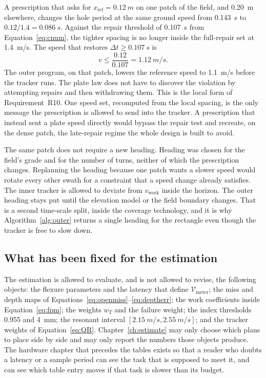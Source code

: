 A prescription that asks for \(x_{\mathrm{ref}}=\SI{0.12}{m}\) on one patch of the field, and \SI{0.20}{m} elsewhere, changes the hole period at the same ground speed from \SI{0.143}{s} to \(0.12/1.4=\SI{0.086}{s}\). Against the repair threshold of \SI{0.107}{s} from Equation~\eqref{eq:cnum}, the tighter spacing is no longer inside the full-repair set at \SI{1.4}{m/s}. The speed that restores \(\Delta t\ge\SI{0.107}{s}\) is
\begin{equation}
\label{eq:vpresc}
v \le \frac{0.12}{0.107} = \SI{1.12}{m/s}.
\end{equation}
The outer program, on that patch, lowers the reference speed to \SI{1.1}{m/s} before the tracker runs. The plate law does not have to discover the violation by attempting repairs and then withdrawing them. This is the local form of Requirement~R10. One speed set, recomputed from the local spacing, is the only message the prescription is allowed to send into the tracker. A prescription that instead sent a plate speed directly would bypass the repair test and recreate, on the dense patch, the late-repair regime the whole design is built to avoid.

The same patch does not require a new heading. Heading was chosen for the field's grade and for the number of turns, neither of which the prescription changes. Replanning the heading because one patch wants a slower speed would rotate every other swath for a constraint that a speed change already satisfies. The inner tracker is allowed to deviate from \(v_{\mathrm{work}}\) inside the horizon. The outer heading stays put until the elevation model or the field boundary changes. That is a second time-scale split, inside the coverage technology, and it is why Algorithm~\ref{alg:outer} returns a single heading for the rectangle even though the tracker is free to slow down.

\subsection{What has been fixed for the estimation}

The estimation is allowed to evaluate, and is not allowed to revise, the following objects: the flexure parameters and the latency that define \(\mathcal{V}_{\mathrm{meter}}\); the miss and depth maps of Equations~\eqref{eq:openmiss}--\eqref{eq:deptherr}; the work coefficients inside Equation~\eqref{eq:fpm}; the weights \(w_T\) and the failure weight; the index thresholds \num{0.955} and \SI{4}{mm}; the resonant interval \([\SI{2.15}{m/s},\SI{2.55}{m/s}]\); and the tracker weights of Equation~\eqref{eq:QR}. Chapter~\ref{ch:estimate} may only choose which plans to place side by side and may only report the numbers those objects produce. The hardware chapter that precedes the tables exists so that a reader who doubts a latency or a sample period can see the task that is supposed to meet it, and can see which table entry moves if that task is slower than its budget.

